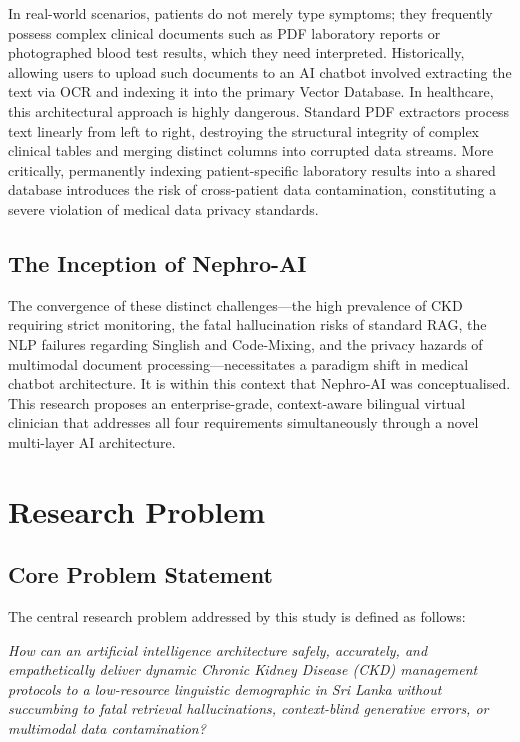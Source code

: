 \documentclass[12pt,a4paper]{report}
\begin{document}
In real-world scenarios, patients do not merely type symptoms; they frequently possess complex clinical documents such as PDF laboratory reports or photographed blood test results, which they need interpreted. Historically, allowing users to upload such documents to an AI chatbot involved extracting the text via OCR and indexing it into the primary Vector Database. In healthcare, this architectural approach is highly dangerous. Standard PDF extractors process text linearly from left to right, destroying the structural integrity of complex clinical tables and merging distinct columns into corrupted data streams. More critically, permanently indexing patient-specific laboratory results into a shared database introduces the risk of cross-patient data contamination, constituting a severe violation of medical data privacy standards.

\subsection{The Inception of Nephro-AI}

The convergence of these distinct challenges---the high prevalence of CKD requiring strict monitoring, the fatal hallucination risks of standard RAG, the NLP failures regarding Singlish and Code-Mixing, and the privacy hazards of multimodal document processing---necessitates a paradigm shift in medical chatbot architecture. It is within this context that Nephro-AI was conceptualised. This research proposes an enterprise-grade, context-aware bilingual virtual clinician that addresses all four requirements simultaneously through a novel multi-layer AI architecture.

\section{Research Problem}
\label{sec:problem}

\subsection{Core Problem Statement}

The central research problem addressed by this study is defined as follows:

\begin{mdframed}
\textit{How can an artificial intelligence architecture safely, accurately, and empathetically deliver dynamic Chronic Kidney Disease (CKD) management protocols to a low-resource linguistic demographic in Sri Lanka without succumbing to fatal retrieval hallucinations, context-blind generative errors, or multimodal data contamination?}
\end{mdframed}
\end{document}
